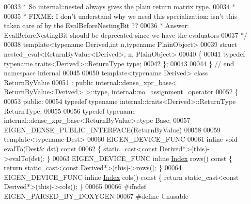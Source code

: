 \begin{DoxyCode}
00033 \textcolor{comment}{ * So internal::nested always gives the plain return matrix type.}
00034 \textcolor{comment}{ *}
00035 \textcolor{comment}{ * FIXME: I don't understand why we need this specialization: isn't this taken care of by the
       EvalBeforeNestingBit ??}
00036 \textcolor{comment}{ * Answer: EvalBeforeNestingBit should be deprecated since we have the evaluators}
00037 \textcolor{comment}{ */}
00038 \textcolor{keyword}{template}<\textcolor{keyword}{typename} Derived,\textcolor{keywordtype}{int} n,\textcolor{keyword}{typename} PlainObject>
00039 \textcolor{keyword}{struct }nested\_eval<ReturnByValue<Derived>, n, PlainObject>
00040 \{
00041   \textcolor{keyword}{typedef} \textcolor{keyword}{typename} traits<Derived>::ReturnType type;
00042 \};
00043 
00044 \} \textcolor{comment}{// end namespace internal}
00045 
00050 \textcolor{keyword}{template}<\textcolor{keyword}{typename} Derived> \textcolor{keyword}{class }ReturnByValue
00051   : \textcolor{keyword}{public} internal::dense\_xpr\_base< ReturnByValue<Derived> >::type, internal::no\_assignment\_operator
00052 \{
00053   \textcolor{keyword}{public}:
00054     \textcolor{keyword}{typedef} \textcolor{keyword}{typename} internal::traits<Derived>::ReturnType ReturnType;
00055 
00056     \textcolor{keyword}{typedef} \textcolor{keyword}{typename} internal::dense\_xpr\_base<ReturnByValue>::type Base;
00057     EIGEN\_DENSE\_PUBLIC\_INTERFACE(ReturnByValue)
00058 
00059     \textcolor{keyword}{template}<\textcolor{keyword}{typename} Dest>
00060     EIGEN\_DEVICE\_FUNC
00061     \textcolor{keyword}{inline} \textcolor{keywordtype}{void} evalTo(Dest& dst)\textcolor{keyword}{ const}
00062 \textcolor{keyword}{    }\{ \textcolor{keyword}{static\_cast<}\textcolor{keyword}{const }Derived*\textcolor{keyword}{>}(\textcolor{keyword}{this})->evalTo(dst); \}
00063     EIGEN\_DEVICE\_FUNC \textcolor{keyword}{inline} \hyperlink{namespace_eigen_a62e77e0933482dafde8fe197d9a2cfde}{Index} rows()\textcolor{keyword}{ const }\{ \textcolor{keywordflow}{return} \textcolor{keyword}{static\_cast<}\textcolor{keyword}{const }Derived*\textcolor{keyword}{>}(\textcolor{keyword}{this})->rows(); \}
00064     EIGEN\_DEVICE\_FUNC \textcolor{keyword}{inline} \hyperlink{namespace_eigen_a62e77e0933482dafde8fe197d9a2cfde}{Index} cols()\textcolor{keyword}{ const }\{ \textcolor{keywordflow}{return} \textcolor{keyword}{static\_cast<}\textcolor{keyword}{const }Derived*\textcolor{keyword}{>}(\textcolor{keyword}{this})->cols(); \}
00065 
00066 \textcolor{preprocessor}{#ifndef EIGEN\_PARSED\_BY\_DOXYGEN}
00067 \textcolor{preprocessor}{#define Unusable
}
\end{DoxyCode}
